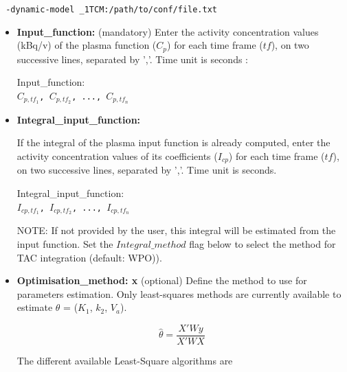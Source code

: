 \documentclass[a4paper, 11pt]{article}
\begin{document}
\bigskip
\verb| -dynamic-model _1TCM:/path/to/conf/file.txt|
\bigskip


\begin{itemize}

\item \textbf{Input\_function:}	(mandatory)
Enter the activity concentration values (kBq/v) of the plasma function ($C_p$) for each time frame ($tf$), on two successive lines, separated by ','. Time unit is seconds :

\bigskip
Input\_function: \\
\texttt{$C_{p,tf_1}$, $C_{p,tf_2}$, ..., $C_{p,tf_n}$}
\bigskip


\item \textbf{Integral\_input\_function:}

If the integral of the plasma input function is already computed, enter the activity concentration values of its coefficients ($I_{cp}$) for each time frame ($tf$), on two successive lines, separated by ','. Time unit is seconds.


\bigskip
Integral\_input\_function: \\
\texttt{$I_{cp,tf_1}$, $I_{cp,tf_2}$, ..., $I_{cp,tf_n}$}
\bigskip


NOTE: If not provided by the user, this integral will be estimated from the input function. Set the $Integral\_method$ flag below to select the method for TAC integration (default: WPO)).


\item \textbf{Optimisation\_method: x} (optional) Define the method to use for parameters estimation. Only least-squares methods are currently available to estimate $\theta$ = ($K_1$, $k_2$, $V_a$).

\begin{equation}
\widehat{\theta} = \frac{X'Wy}{X'WX}
\label{eq_NNLS}
\end{equation}


The different available Least-Square algorithms are

\end{itemize}
\end{document}
